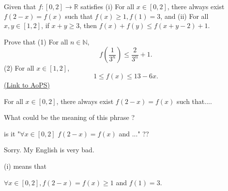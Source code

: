 \begin{problem}
	Given that $ f: [0,2] \rightarrow \mathbb{R}$ satisfies
(i) For all $ x \in [0,2]$, there always exist $ f(2 - x) = f(x)$ such that $ f(x) \geq 1, f(1) = 3$, and
(ii) For all $ x,y \in [1,2]$, if $ x + y \geq 3$, then $ f(x) + f(y) \leq f(x + y - 2) + 1$.

Prove that
(1) For all $n \in \mathbb N$, \[ f \left(\frac {1}{3^n} \right) \leq \frac {2}{3^n} + 1.\]
(2) For all $ x \in [1,2]$,
\[1 \leq f(x) \leq 13 - 6x.\]
	\flushright \href{https://artofproblemsolving.com/community/c6h275520}{(Link to AoPS)}
\end{problem}



\begin{solution}
	\begin{tcolorbox}  For all $ x \in [0,2]$, there always exist $ f(2 - x) = f(x)$ such that....\end{tcolorbox}

What could be the meaning of this phrase ?

is it "$ \forall x\in[0,2]$ $ f(2-x)=f(x)$ and ..." ??
\end{solution}



\begin{solution}
	Sorry. My English is very bad.

(i) means that
 
$ \forall x \in [0,2] , f(2-x)=f(x) \geq 1$ and $ f(1)=3$.
\end{solution}




